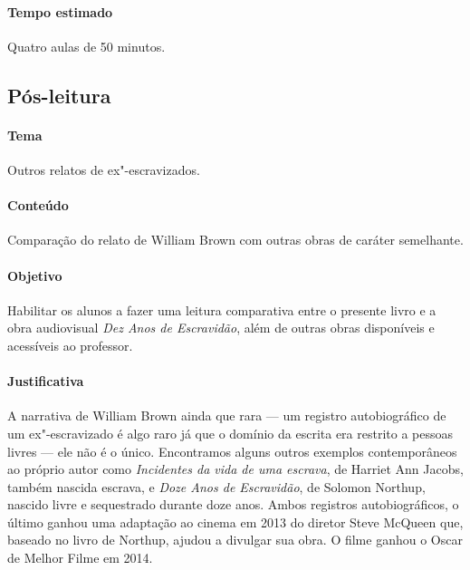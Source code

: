 \documentclass[11pt]{extarticle}
\begin{document}
 \paragraph{Tempo estimado} Quatro aulas de 50 minutos.





\subsection{Pós-leitura}


 \paragraph{Tema} Outros relatos de ex"-escravizados.

 \paragraph{Conteúdo} Comparação do relato de William Brown com outras
 obras de caráter semelhante.

 \paragraph{Objetivo} Habilitar os alunos a fazer uma leitura comparativa
 entre o presente livro e a obra audiovisual \emph{Dez Anos de Escravidão},
 além de outras obras disponíveis e acessíveis ao professor. 

 \paragraph{Justificativa} A narrativa de William Brown ainda que 
 rara --- um registro autobiográfico de um ex"-escravizado é algo raro
 já que o domínio da escrita era restrito a pessoas livres --- ele não 
 é o único. Encontramos alguns outros exemplos contemporâneos 
 ao próprio autor como \emph{Incidentes da vida de uma escrava}, de Harriet
 Ann Jacobs, também nascida escrava, e \emph{Doze Anos de Escravidão}, de 
 Solomon Northup, nascido livre e sequestrado durante doze anos. Ambos 
 registros autobiográficos, o último ganhou uma adaptação ao cinema em 
 2013 do diretor Steve McQueen que, baseado no livro de Northup, ajudou
 a divulgar sua obra. O filme ganhou o Oscar de Melhor Filme em 2014. 
\end{document}
